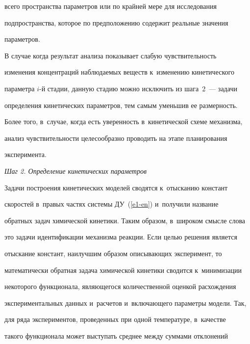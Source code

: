 всего пространства параметров или по крайней мере для исследования 


подпространства, которое по предположению содержит реальные значения 


параметров.


  


  В случае когда результат анализа показывает слабую чувствительность 


изменения концентраций наблюдаемых веществ к~изменению кинетического 


параметра $i$-й стадии, данную стадию можно исключить из шага~2~--- задачи 


определения кинетических параметров, тем самым уменьшив ее размерность. 


Более того, в~случае, когда есть уверенность в~кинетической схеме механизма, 


анализ чувствительности целесообразно проводить на этапе планирования 


эксперимента. 


  


  \medskip


  


  \textit{Шаг 2. Определение кинетических параметров}


  \medskip


  


  Задачи построения кинетических моделей сводятся к~отысканию констант 


скоростей в~правых частях системы ДУ~(\ref{e1-en}) и~получили название 


обратных задач химической кинетики. Таким образом, в~широком смысле слова 


это задачи идентификации механизма реакции. Если целью решения является 


отыскание констант, наилучшим образом описывающих эксперимент, то 


математически обратная задача химической кинетики сводится к~минимизации 


некоторого функционала, являющегося количественной оценкой расхождения 


экспериментальных данных и~расчетов и~включающего параметры модели. Так, 


для ряда экспериментов, проведенных при одной температуре, в~качестве 


такого функционала может выступать среднее между суммами отклонений 


